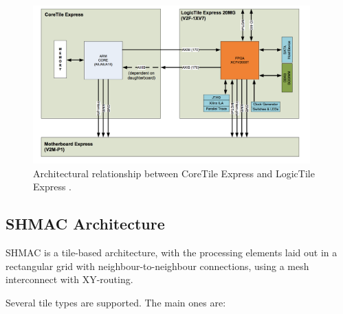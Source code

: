 \begin{figure}[htb]
    \centering
    \includegraphics[width=0.95\textwidth]{Figures/VersatileExpress/OurTiles}
    \caption{Architectural relationship between CoreTile Express and LogicTile Express \cite{LogicTileDataSheet}.}
    \label{fig:logicTile}
\end{figure}

\subsection{SHMAC Architecture}

SHMAC is a tile-based architecture, with the processing elements laid out in a rectangular
grid with neighbour-to-neighbour connections, using a mesh interconnect with XY-routing.

Several tile types are supported. The main ones are:

